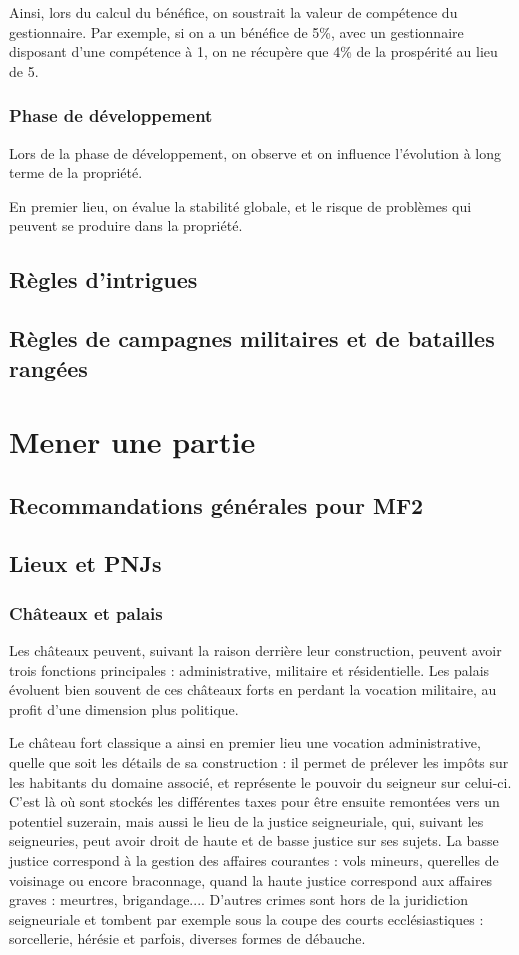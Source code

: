 \documentclass[10pt,a4paper]{book}
\newcommand{\titre}{MF2}
\begin{document}
Ainsi, lors du calcul du bénéfice, on soustrait la valeur de compétence du gestionnaire. Par exemple, si on a un bénéfice de 5\%, avec un gestionnaire disposant d'une compétence à 1, on ne récupère que 4\% de la prospérité au lieu de 5.

\subsection{Phase de développement}
Lors de la phase de développement, on observe et on influence l'évolution à long terme de la propriété.

En premier lieu, on évalue la stabilité globale, et le risque de problèmes qui peuvent se produire dans la propriété.

\section{Règles d'intrigues}
\section{Règles de campagnes militaires et de batailles rangées}


\chapter{Mener une partie}
\section{Recommandations générales pour \titre}
\section{Lieux et PNJs}
\subsection{Châteaux et palais}
Les châteaux peuvent, suivant la raison derrière leur construction, peuvent avoir trois fonctions principales : administrative, militaire et résidentielle.  Les palais évoluent bien souvent de ces châteaux forts en perdant la vocation militaire, au profit d'une dimension plus politique.

Le château fort classique a ainsi en premier lieu une vocation administrative, quelle que soit les détails de sa construction : il permet de prélever les impôts sur les habitants du domaine associé, et représente le pouvoir du seigneur sur celui-ci. C'est là où sont stockés les différentes taxes pour être ensuite remontées vers un potentiel suzerain, mais aussi le lieu de la justice seigneuriale, qui, suivant les seigneuries, peut avoir droit de haute et de basse justice sur ses sujets. La basse justice correspond à la gestion des affaires courantes : vols mineurs, querelles de voisinage ou encore braconnage, quand la haute justice correspond aux affaires graves : meurtres, brigandage.... D'autres crimes sont hors de la juridiction seigneuriale et tombent par exemple sous la coupe des courts ecclésiastiques : sorcellerie, hérésie et parfois, diverses formes de débauche.
\end{document}
